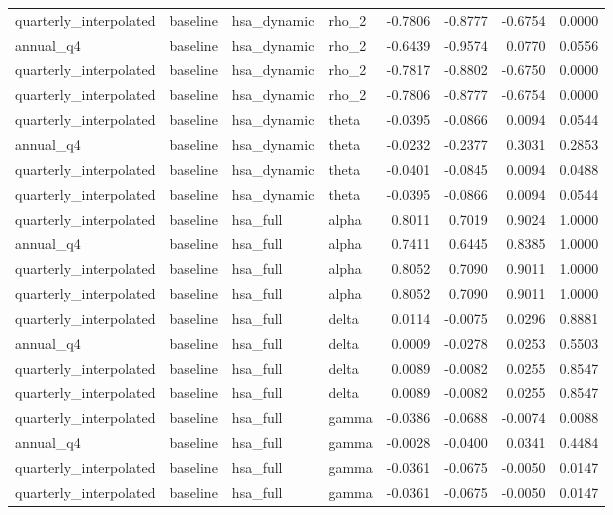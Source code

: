 \begin{tabular}{llllrrrr}
quarterly\_interpolated & baseline & hsa\_dynamic & rho\_2 & -0.7806 & -0.8777 & -0.6754 & 0.0000 \\
annual\_q4 & baseline & hsa\_dynamic & rho\_2 & -0.6439 & -0.9574 & 0.0770 & 0.0556 \\
quarterly\_interpolated & baseline & hsa\_dynamic & rho\_2 & -0.7817 & -0.8802 & -0.6750 & 0.0000 \\
quarterly\_interpolated & baseline & hsa\_dynamic & rho\_2 & -0.7806 & -0.8777 & -0.6754 & 0.0000 \\
quarterly\_interpolated & baseline & hsa\_dynamic & theta & -0.0395 & -0.0866 & 0.0094 & 0.0544 \\
annual\_q4 & baseline & hsa\_dynamic & theta & -0.0232 & -0.2377 & 0.3031 & 0.2853 \\
quarterly\_interpolated & baseline & hsa\_dynamic & theta & -0.0401 & -0.0845 & 0.0094 & 0.0488 \\
quarterly\_interpolated & baseline & hsa\_dynamic & theta & -0.0395 & -0.0866 & 0.0094 & 0.0544 \\
quarterly\_interpolated & baseline & hsa\_full & alpha & 0.8011 & 0.7019 & 0.9024 & 1.0000 \\
annual\_q4 & baseline & hsa\_full & alpha & 0.7411 & 0.6445 & 0.8385 & 1.0000 \\
quarterly\_interpolated & baseline & hsa\_full & alpha & 0.8052 & 0.7090 & 0.9011 & 1.0000 \\
quarterly\_interpolated & baseline & hsa\_full & alpha & 0.8052 & 0.7090 & 0.9011 & 1.0000 \\
quarterly\_interpolated & baseline & hsa\_full & delta & 0.0114 & -0.0075 & 0.0296 & 0.8881 \\
annual\_q4 & baseline & hsa\_full & delta & 0.0009 & -0.0278 & 0.0253 & 0.5503 \\
quarterly\_interpolated & baseline & hsa\_full & delta & 0.0089 & -0.0082 & 0.0255 & 0.8547 \\
quarterly\_interpolated & baseline & hsa\_full & delta & 0.0089 & -0.0082 & 0.0255 & 0.8547 \\
quarterly\_interpolated & baseline & hsa\_full & gamma & -0.0386 & -0.0688 & -0.0074 & 0.0088 \\
annual\_q4 & baseline & hsa\_full & gamma & -0.0028 & -0.0400 & 0.0341 & 0.4484 \\
quarterly\_interpolated & baseline & hsa\_full & gamma & -0.0361 & -0.0675 & -0.0050 & 0.0147 \\
quarterly\_interpolated & baseline & hsa\_full & gamma & -0.0361 & -0.0675 & -0.0050 & 0.0147 \\

\end{tabular}
